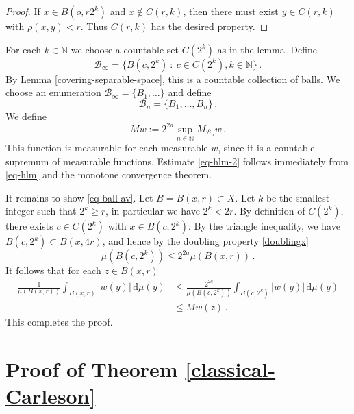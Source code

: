 {\begin{proof}
    If $x \in B(o, r2^k)$ and $x \notin C(r,k)$, then there must exist $y \in C(r,k)$ with $\rho(x,y) < r$. Thus $C(r,k)$ has the desired property.
\end{proof}

For each $k \in \mathbb{N}$ we choose a countable set $C(2^k)$ as in the lemma.
Define
$$
    \mathcal{B}_\infty = \{B(c, 2^k) \ : \ c \in C(2^k), k \in \mathbb{N}\}\,.
$$
By Lemma \ref{covering-separable-space}, this is a countable collection of balls. We choose an enumeration $\mathcal{B}_\infty = \{B_1, \dotsc\}$ and define
$$
    \mathcal{B}_n = \{B_1, \dotsc, B_n\}\,.
$$
We define
$$
    Mw := 2^{2a}\sup_{n \in \mathbb{N}} M_{\mathcal{B}_n}w\,.
$$
This function is measurable for each measurable $w$, since it is a countable supremum of measurable functions. Estimate \eqref{eq-hlm-2} follows immediately from \eqref{eq-hlm} and the monotone convergence theorem.

It remains to show \eqref{eq-ball-av}. Let $B = B(x, r) \subset X$. Let $k$ be the smallest integer such that $2^k \ge r$, in particular we have $2^k < 2r$. By definition of $C(2^k)$, there exists $c \in C(2^k)$ with $x \in B(c, 2^k)$. By the triangle inequality, we have $B(c, 2^k) \subset B(x, 4r)$, and hence by the doubling property \eqref{doublingx}
$$
    \mu(B(c, 2^k)) \le 2^{2a} \mu(B(x,r))\,.
$$
It follows that for each $z \in B(x,r)$
\begin{align*}
    \frac{1}{\mu(B(x,r))}\int_{B(x,r)} |w(y)| \, \mathrm{d}\mu(y) &\le \frac{2^{2a}}{\mu(B(c,2^k))}\int_{B(c,2^k)} |w(y)| \, \mathrm{d}\mu(y) \\
    &\le Mw(z)\,.
\end{align*}
This completes the proof.


\chapter{Proof of Theorem \ref{classical-Carleson}}



}
